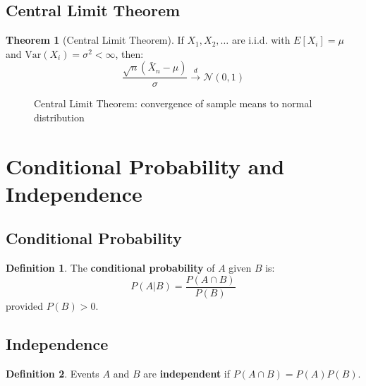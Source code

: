 \documentclass[11pt]{article}
\theoremstyle{definition}
\newtheorem{definition}{Definition}[section]
\newtheorem{theorem}{Theorem}[section]
\begin{document}
\subsection{Central Limit Theorem}
\begin{theorem}[Central Limit Theorem]
If $X_1, X_2, \ldots$ are i.i.d. with $E[X_i] = \mu$ and $\text{Var}(X_i) = \sigma^2 < \infty$, then:
$$\frac{\sqrt{n}(\bar{X}_n - \mu)}{\sigma} \xrightarrow{d} \mathcal{N}(0,1)$$
\end{theorem}

\begin{figure}[h]
\centering
{}
\caption{Central Limit Theorem: convergence of sample means to normal distribution}
\end{figure}

\section{Conditional Probability and Independence}

\subsection{Conditional Probability}
\begin{definition}
The \textbf{conditional probability} of $A$ given $B$ is:
$$P(A|B) = \frac{P(A \cap B)}{P(B)}$$
provided $P(B) > 0$.
\end{definition}

\subsection{Independence}
\begin{definition}
Events $A$ and $B$ are \textbf{independent} if $P(A \cap B) = P(A)P(B)$.
\end{definition}
\end{document}
